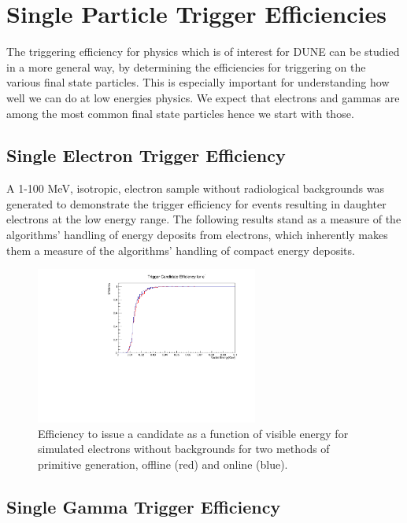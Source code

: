 \documentclass[10pt]{article}
\begin{document}
\section{Single Particle Trigger Efficiencies}
The triggering efficiency for physics which is of interest for DUNE can be studied in a more general way, by determining the efficiencies for triggering on the various final state particles. This is especially important for understanding how well we can do at low energies physics. We expect that electrons and gammas are among the most common final state particles hence we start with those. 


\subsection{Single Electron Trigger Efficiency}
A 1-100 MeV, isotropic, electron sample without radiological backgrounds was generated to demonstrate the trigger efficiency for events resulting in daughter electrons at the low energy range. The following results stand as a measure of the algorithms' handling of energy deposits from electrons, which inherently makes them a measure of the algorithms' handling of compact energy deposits.

\begin{figure}[H]
    \centering
    \includegraphics[angle=270,width=0.65\textwidth]{UpdatedEff/SingleParticle/Electron_Efficiency_Comparison.pdf}
    \caption{Efficiency to issue a candidate as a function of visible energy for simulated electrons without backgrounds for two methods of primitive generation, offline (red) and online (blue).}
    \label{fig:eff_electron}
\end{figure}

\subsection{Single Gamma Trigger Efficiency}
\end{document}
